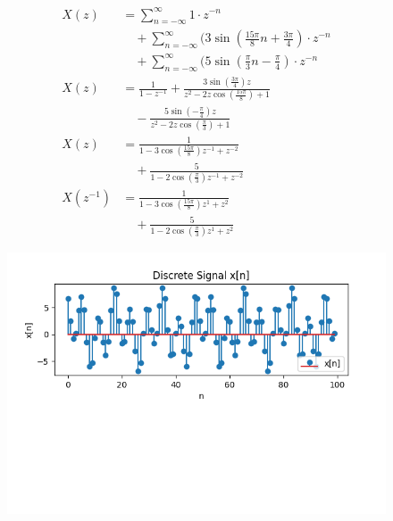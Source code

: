 \documentclass[journal,12pt,twocolumn]{IEEEtran}
\begin{document}
\begin{align}
X(z) &= \sum_{n=-\infty}^{\infty} 1 \cdot z^{-n} \\
&\quad + \sum_{n=-\infty}^{\infty} (3\sin\left(\frac{15\pi}{8}n + \frac{3\pi}{4}\right) \cdot z^{-n} \\
&\quad + \sum_{n=-\infty}^{\infty} (5\sin\left(\frac{\pi}{3}n - \frac{\pi}{4}\right) \cdot z^{-n}\\
X(z) &= \frac{1}{1 - z^{-1}} + \frac{3\sin\left(\frac{3\pi}{4}\right)z}{z^2 - 2z\cos\left(\frac{15\pi}{8}\right) + 1} \\
&\quad - \frac{5\sin\left(-\frac{\pi}{4}\right)z}{z^2 - 2z\cos\left(\frac{\pi}{3}\right) + 1}\\
X(z) &= \frac{1}{1 - 3\cos\left(\frac{15\pi}{8}\right)z^{-1} + z^{-2}} \\
&\quad + \frac{5}{1 - 2\cos\left(\frac{\pi}{3}\right)z^{-1} + z^{-2}}\\
X(z^{-1})&= \frac{1}{1 - 3\cos\left(\frac{15\pi}{8}\right)z^{1} + z^{2}} \\
&\quad + \frac{5}{1 - 2\cos\left(\frac{\pi}{3}\right)z^{1} + z^{2}}
\end{align}
\begin{figure}[!ht] 
\centering
\includegraphics[width=2\columnwidth]{graph.png}
\label{fig:Graph1}
\end{figure}
\end{document}
